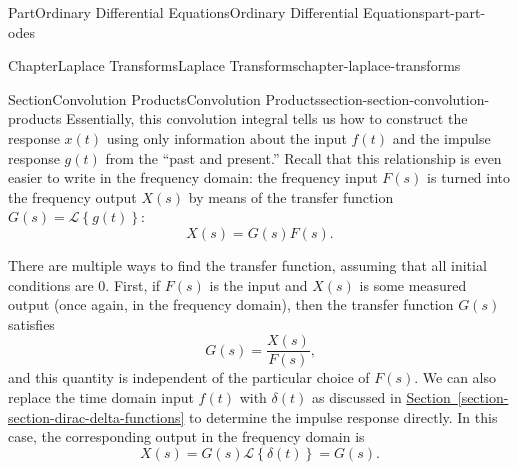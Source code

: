 \documentclass[twoside,10pt,]{book}
\newcommand{\xreffont}{\relax}
\numberwithin{equation}{part}
\newcommand{\Laplace}[1]{\mathcal{L}\set{#1}}
\newcommand{\set}[1]{\left\{ #1 \right\}}
\begin{document}
\begin{partptx}{Part}{Ordinary Differential Equations}{}{Ordinary Differential Equations}{}{}{part-part-odes}
\begin{chapterptx}{Chapter}{Laplace Transforms}{}{Laplace Transforms}{}{}{chapter-laplace-transforms}
\begin{sectionptx}{Section}{Convolution Products}{}{Convolution Products}{}{}{section-section-convolution-products}
Essentially, this convolution integral tells us how to construct the response \(x(t)\) using only information about the input \(f(t)\) and the impulse response \(g(t)\) from the ``past and present.'' Recall that this relationship is even easier to write in the frequency domain: the frequency input \(F(s)\) is turned into the frequency output \(X(s)\) by means of the transfer function \(G(s) = \Laplace{g(t)}\):%
\begin{equation*}
X(s) = G(s)F(s)\text{.}
\end{equation*}
%
\par
There are multiple ways to find the transfer function, assuming that all initial conditions are \(0\). First, if \(F(s)\) is the input and \(X(s)\) is some measured output (once again, in the frequency domain), then the transfer function \(G(s)\) satisfies%
\begin{equation*}
G(s) = \frac{X(s)}{F(s)}\text{,}
\end{equation*}
and this quantity is independent of the particular choice of \(F(s)\). We can also replace the time domain input \(f(t)\) with \(\delta(t)\) as discussed in \hyperref[section-section-dirac-delta-functions]{Section~{\xreffont\ref{section-section-dirac-delta-functions}}} to determine the impulse response directly. In this case, the corresponding output in the frequency domain is%
\begin{equation*}
X(s) = G(s)\Laplace{\delta(t)} = G(s)\text{.}
\end{equation*}
%
\end{sectionptx}
\end{chapterptx}
 \end{partptx}
%
%
\typeout{************************************************}
\typeout{************************************************}
%
\end{document}
